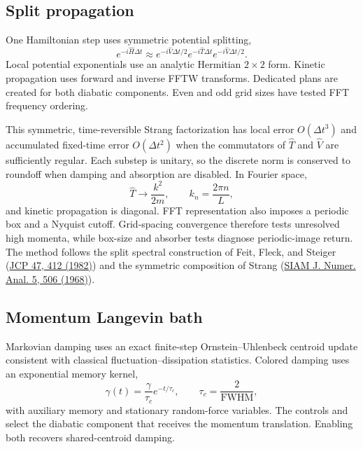 \documentclass[11pt]{article}
\newcommand{\code}[1]{\texttt{\detokenize{#1}}}
\begin{document}
\subsection{Split propagation}

One Hamiltonian step uses symmetric potential splitting,
\begin{equation}
  e^{-i\hat H\Delta t}\approx e^{-i\hat V\Delta t/2}
  e^{-i\hat T\Delta t}e^{-i\hat V\Delta t/2}.
\end{equation}
Local potential exponentials use an analytic Hermitian $2\times2$ form.
Kinetic propagation uses forward and inverse FFTW transforms. Dedicated plans
are created for both diabatic components. Even and odd grid sizes have tested
FFT frequency ordering.

This symmetric, time-reversible Strang factorization has local error
$O(\Delta t^3)$ and accumulated fixed-time error $O(\Delta t^2)$ when the
commutators of $\hat T$ and $\hat V$ are sufficiently regular. Each substep is
unitary, so the discrete norm is conserved to roundoff when damping and absorption
are disabled. In Fourier space,
\begin{equation}
 \hat T\longrightarrow \frac{k^2}{2m},\qquad
 k_n=\frac{2\pi n}{L},
\end{equation}
and kinetic propagation is diagonal. FFT representation also imposes a periodic
box and a Nyquist cutoff. Grid-spacing convergence therefore tests unresolved high
momenta, while box-size and absorber tests diagnose periodic-image return. The
method follows the split spectral construction of Feit, Fleck, and Steiger
(\href{https://doi.org/10.1016/0021-9991(82)90091-2}{JCP 47, 412 (1982)}) and the
symmetric composition of Strang
(\href{https://doi.org/10.1137/0705041}{SIAM J. Numer. Anal. 5, 506 (1968)}).

\subsection{Momentum Langevin bath}

Markovian damping uses an exact finite-step Ornstein--Uhlenbeck centroid update
consistent with classical fluctuation--dissipation statistics. Colored damping
uses an exponential memory kernel,
\begin{equation}
  \gamma(t)=\frac{\gamma}{\tau_c}e^{-t/\tau_c},\qquad
  \tau_c=\frac{2}{\mathrm{FWHM}},
\end{equation}
with auxiliary memory and stationary random-force variables. The controls
\code{damp_reactant} and \code{damp_product} select the diabatic component that
receives the momentum translation. Enabling both recovers shared-centroid
damping.
\end{document}
